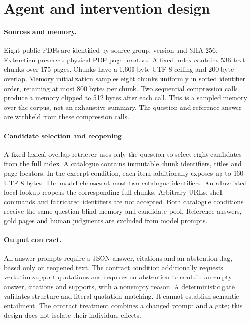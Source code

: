 \documentclass{article}
\begin{document}
\section{Agent and intervention design}
\paragraph{Sources and memory.}
Eight public PDFs are identified by source group, version and SHA-256. Extraction preserves physical PDF-page locators. A fixed index contains 536 text chunks over 175 pages. Chunks have a 1,600-byte UTF-8 ceiling and 200-byte overlap. Memory initialization samples eight chunks uniformly in sorted identifier order, retaining at most 800 bytes per chunk. Two sequential compression calls produce a memory clipped to 512 bytes after each call. This is a sampled memory over the corpus, not an exhaustive summary. The question and reference answer are withheld from these compression calls.

\paragraph{Candidate selection and reopening.}
A fixed lexical-overlap retriever uses only the question to select eight candidates from the full index. A catalogue contains immutable chunk identifiers, titles and page locators. In the excerpt condition, each item additionally exposes up to 160 UTF-8 bytes. The model chooses at most two catalogue identifiers. An allowlisted local lookup reopens the corresponding full chunks. Arbitrary URLs, shell commands and fabricated identifiers are not accepted. Both catalogue conditions receive the same question-blind memory and candidate pool. Reference answers, gold pages and human judgments are excluded from model prompts.

\paragraph{Output contract.}
All answer prompts require a JSON answer, citations and an abstention flag, based only on reopened text. The contract condition additionally requests verbatim support quotations and requires an abstention to contain an empty answer, citations and supports, with a nonempty reason. A deterministic gate validates structure and literal quotation matching. It cannot establish semantic entailment. The contract treatment combines a changed prompt and a gate; this design does not isolate their individual effects.
\end{document}
